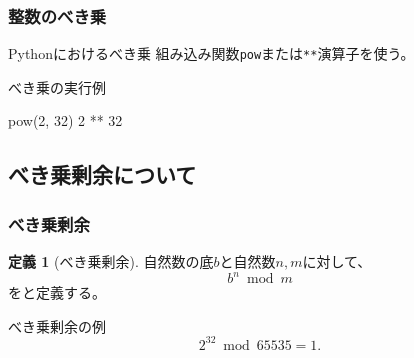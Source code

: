 \documentclass[aspectratio=169,dvipdfmx,14pt,notheorems]{beamer}
\theoremstyle{definition}
\newtheorem{definition}{定義}
\begin{document}
\begin{frame}[fragile]\frametitle{整数のべき乗}

\begin{block}{Pythonにおけるべき乗}
組み込み関数\texttt{pow}または\texttt{**}演算子を使う。
\end{block}

\begin{exampleblock}{べき乗の実行例}

\begin{pyconsole}
pow(2, 32)
2 ** 32
\end{pyconsole}

\end{exampleblock}

\end{frame}

\subsection{べき乗剰余について}

\begin{frame}\frametitle{べき乗剰余}
\begin{definition}[べき乗剰余]
自然数の底$b$と自然数$n, m$に対して、
\begin{equation*}
b^{n} \bmod{m}
\end{equation*}
をと定義する。
\end{definition}

\begin{exampleblock}{べき乗剰余の例}
\begin{equation*}
2^{32} \bmod{65535} = 1.
\end{equation*}
\end{exampleblock}

\end{frame}
\end{document}
